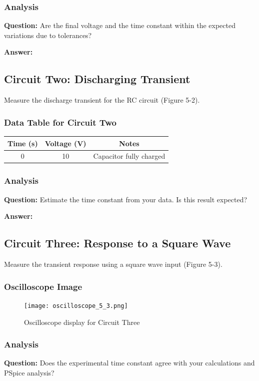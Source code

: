 \documentclass[12pt]{article}
\begin{document}
\subsubsection{Analysis}
\textbf{Question:} Are the final voltage and the time constant within the expected variations due to tolerances?

\textbf{Answer:} \\

\subsection{Circuit Two: Discharging Transient}
Measure the discharge transient for the RC circuit (Figure 5-2).

\subsubsection{Data Table for Circuit Two}
\begin{tabular}{ccc}
	\toprule
	Time (s) & Voltage (V) & Notes                   \\
	\midrule
	0        & 10          & Capacitor fully charged \\
	\bottomrule
\end{tabular}

\subsubsection{Analysis}
\textbf{Question:} Estimate the time constant from your data. Is this result expected?

\textbf{Answer:} \\

\subsection{Circuit Three: Response to a Square Wave}
Measure the transient response using a square wave input (Figure 5-3).

\subsubsection{Oscilloscope Image}
\begin{figure}[H]
	\centering
	\texttt{[image: oscilloscope\_5\_3.png]}
	\caption{Oscilloscope display for Circuit Three}
\end{figure}

\subsubsection{Analysis}
\textbf{Question:} Does the experimental time constant agree with your calculations and PSpice analysis?
\end{document}
